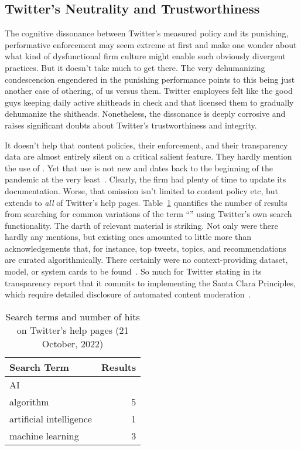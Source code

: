 \subsection{Twitter's Neutrality and Trustworthiness}
\label{sec:trusting-twitter}

The cognitive dissonance between Twitter's measured policy and its punishing,
performative enforcement may seem extreme at first and make one wonder about
what kind of dysfunctional firm culture might enable such obviously divergent
practices. But it doesn't take much to get there. The very dehumanizing
condescencion engendered in the punishing performance points to this being just
another case of othering, of us versus them. Twitter employees felt like the
good guys keeping daily active shitheads in check and that licensed them to
gradually dehumanize the shitheads. Nonetheless, the dissonance is deeply
corrosive and raises significant doubts about Twitter's trustworthiness and
integrity.

It doesn't help that content policies, their enforcement, and their transparency
data are almost entirely silent on a critical salient feature. They hardly
mention the use of . Yet that use is not new and dates back to the
beginning of the pandemic at the very least~\cite{ScottKayali2020}. Clearly, the
firm had plenty of time to update its documentation. Worse, that omission isn't
limited to content policy etc, but extends to \emph{all} of Twitter's help
pages. Table~\ref{table:search} quantifies the number of results from searching
for common variations of the term ``'' using Twitter's own search
functionality. The darth of relevant material is striking. Not only were there
hardly any mentions, but existing ones amounted to little more than
acknowledgements that, for instance, top tweets, topics, and recommendations are
curated algorithmically. There certainly were no context-providing dataset,
model, or system cards to be
found~\cite{GebruMorgensternea2021,MitchellWuea2019,ProcopeCheemaea2022}. So
much for Twitter stating in its transparency report that it commits to
implementing the Santa Clara Principles, which require detailed disclosure of
automated content
moderation~\cite{AccessNowACLUFoundationOfNorthernCaliforniaea2021}.

\begin{table}
\caption{Search terms and number of hits on Twitter's help pages (21 October, 2022)}
\label{table:search}
\begin{tabular}{lr}
\textbf{Search Term} & \textbf{Results} \B \\ \hline
AI & \T0 \\
algorithm & 5 \\
artificial intelligence & 1 \\
machine learning & 3 \\
\end{tabular}
\end{table}

